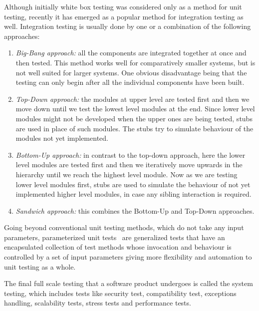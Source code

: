 Although initially white box testing was considered only as a method for unit testing, recently it has emerged as a popular method for integration testing as well. Integration testing is usually done by one or a combination of the following approaches: 
\begin{enumerate}[\IEEEsetlabelwidth{Z}]
\item \textit{Big-Bang approach:} all the components are integrated together at once and then tested. This method works well for comparatively smaller systems, but is not well suited for larger systems. One obvious disadvantage being that the testing can only begin after all the individual components have been built.
\item \textit{Top-Down approach:} the modules at upper level are tested first and then we move down until we test the lowest level modules at the end. Since lower level modules might not be developed when the upper ones are being tested, stubs are used in place of such modules. The stubs try to simulate behaviour of the modules not yet implemented.
\item \textit{Bottom-Up approach:} in contrast to the top-down approach, here the lower level modules are tested first and then we iteratively move upwards in the hierarchy until we reach the highest level module. Now as we are testing lower level modules first, stubs are used to simulate the behaviour of not yet implemented higher level modules, in case any sibling interaction is required.
\item \textit{Sandwich approach:} this combines the Bottom-Up and Top-Down approaches.
\end{enumerate}

Going beyond conventional unit testing methods, which do not take any input parameters, parameterized unit tests~\cite{tillmann2010parameterized} are generalized tests that have an encapsulated collection of test methods whose invocation and behaviour is controlled by a set of input parameters giving more flexibility and automation to unit testing as a whole.

The final full scale testing that a software product undergoes is called the system testing, which includes tests like security test, compatibility test, exceptions handling, scalability tests, stress tests and performance tests.

